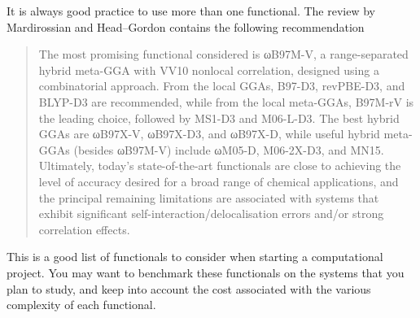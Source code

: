 \documentclass[../Main/chem371-notes.tex]{subfiles}
\begin{document}
It is always good practice to use more than one functional.
The review by Mardirossian and Head--Gordon contains the following recommendation
\begin{quote}
The most promising functional considered is ωB97M-V, a range-separated hybrid meta-GGA with VV10 nonlocal correlation, designed using a combinatorial approach. From the local GGAs, B97-D3, revPBE-D3, and BLYP-D3 are recommended, while from the local meta-GGAs, B97M-rV is the leading choice, followed by MS1-D3 and M06-L-D3. The best hybrid GGAs are ωB97X-V, ωB97X-D3, and ωB97X-D, while useful hybrid meta-GGAs (besides ωB97M-V) include ωM05-D, M06-2X-D3, and MN15. Ultimately, today's state-of-the-art functionals are close to achieving the level of accuracy desired for a broad range of chemical applications, and the principal remaining limitations are associated with systems that exhibit significant self-interaction/delocalisation errors and/or strong correlation effects.
\end{quote}

This is a good list of functionals to consider when starting a computational project.
You may want to benchmark these functionals on the systems that you plan to study, and keep into account the cost associated with the various complexity of each functional.
\end{document}
